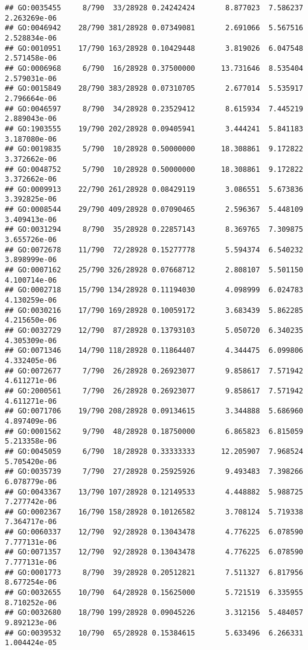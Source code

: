 \documentclass[
]{article}
\begin{document}
\begin{verbatim}
## GO:0035455     8/790  33/28928 0.24242424       8.877023  7.586237 2.263269e-06
## GO:0046942    28/790 381/28928 0.07349081       2.691066  5.567516 2.528834e-06
## GO:0010951    17/790 163/28928 0.10429448       3.819026  6.047548 2.571458e-06
## GO:0006968     6/790  16/28928 0.37500000      13.731646  8.535404 2.579031e-06
## GO:0015849    28/790 383/28928 0.07310705       2.677014  5.535917 2.796664e-06
## GO:0046597     8/790  34/28928 0.23529412       8.615934  7.445219 2.889043e-06
## GO:1903555    19/790 202/28928 0.09405941       3.444241  5.841183 3.187080e-06
## GO:0019835     5/790  10/28928 0.50000000      18.308861  9.172822 3.372662e-06
## GO:0048752     5/790  10/28928 0.50000000      18.308861  9.172822 3.372662e-06
## GO:0009913    22/790 261/28928 0.08429119       3.086551  5.673836 3.392825e-06
## GO:0008544    29/790 409/28928 0.07090465       2.596367  5.448109 3.409413e-06
## GO:0031294     8/790  35/28928 0.22857143       8.369765  7.309875 3.655726e-06
## GO:0072678    11/790  72/28928 0.15277778       5.594374  6.540232 3.898999e-06
## GO:0007162    25/790 326/28928 0.07668712       2.808107  5.501150 4.100714e-06
## GO:0002718    15/790 134/28928 0.11194030       4.098999  6.024783 4.130259e-06
## GO:0030216    17/790 169/28928 0.10059172       3.683439  5.862285 4.215650e-06
## GO:0032729    12/790  87/28928 0.13793103       5.050720  6.340235 4.305309e-06
## GO:0071346    14/790 118/28928 0.11864407       4.344475  6.099806 4.332405e-06
## GO:0072677     7/790  26/28928 0.26923077       9.858617  7.571942 4.611271e-06
## GO:2000561     7/790  26/28928 0.26923077       9.858617  7.571942 4.611271e-06
## GO:0071706    19/790 208/28928 0.09134615       3.344888  5.686960 4.897409e-06
## GO:0001562     9/790  48/28928 0.18750000       6.865823  6.815059 5.213358e-06
## GO:0045059     6/790  18/28928 0.33333333      12.205907  7.968524 5.705420e-06
## GO:0035739     7/790  27/28928 0.25925926       9.493483  7.398266 6.078779e-06
## GO:0043367    13/790 107/28928 0.12149533       4.448882  5.988725 7.277742e-06
## GO:0002367    16/790 158/28928 0.10126582       3.708124  5.719338 7.364717e-06
## GO:0060337    12/790  92/28928 0.13043478       4.776225  6.078590 7.777131e-06
## GO:0071357    12/790  92/28928 0.13043478       4.776225  6.078590 7.777131e-06
## GO:0001773     8/790  39/28928 0.20512821       7.511327  6.817956 8.677254e-06
## GO:0032655    10/790  64/28928 0.15625000       5.721519  6.335955 8.710252e-06
## GO:0032680    18/790 199/28928 0.09045226       3.312156  5.484057 9.892123e-06
## GO:0039532    10/790  65/28928 0.15384615       5.633496  6.266331 1.004424e-05

\end{verbatim}
\end{document}

